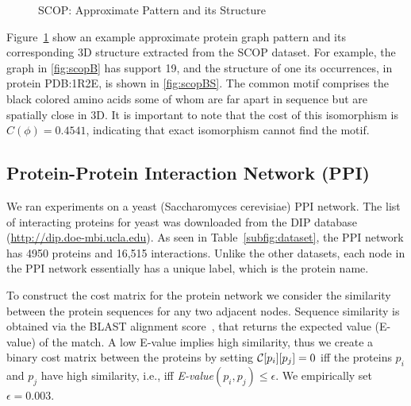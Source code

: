\begin{figure}[!ht]
  \vspace{-0.2in}
  \centerline{
	}
	\caption{SCOP: Approximate Pattern and its Structure}
	\label{fig:scoppats}
\end{figure}

\smallskip{}
Figure~\ref{fig:scoppats} show an example approximate protein graph
pattern and its corresponding 3D structure extracted from the SCOP
dataset.  
For example, the graph in \ref{fig:scopB} has support 19, and the
structure of one its occurrences, in protein PDB:1R2E, is shown in
\ref{fig:scopBS}. The common motif comprises the black colored amino
acids some of whom are far apart in sequence but are spatially close in 3D.
It is important to note that the cost of this isomorphism
is $C(\phi) = 0.4541$, indicating that exact isomorphism cannot find the
motif.

\subsection{Protein-Protein Interaction Network (PPI)} We ran
experiments on a yeast (Saccharomyces cerevisiae) PPI network. The list of
interacting proteins for yeast was downloaded from the DIP database
(\url{http://dip.doe-mbi.ucla.edu}). As seen in
Table~\ref{subfig:dataset}, the
PPI network has 4950 proteins and 16,515 interactions.  Unlike the other
datasets, each node in the PPI network essentially has a unique label,
which is the protein name.  

\smallskip{} 
To construct the cost matrix for the protein network we consider the
similarity between the protein sequences for any two adjacent nodes.
Sequence similarity is obtained via the BLAST alignment
score~\cite{altschul90}, that returns the expected value (E-value) of
the match. A low E-value implies high similarity, thus we create a
binary cost matrix between the proteins by setting
$\mathcal{C}[p_i][p_j] =0$ iff the proteins $p_i$ and $p_j$ have high
similarity, i.e., iff {\em E-value}$(p_i, p_j) \le \epsilon$. We empirically 
set $\epsilon = 0.003$.


